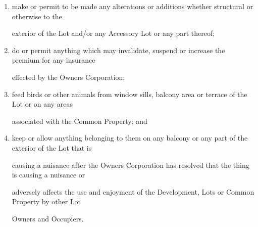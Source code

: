 \documentclass{article}
\begin{document}
\begin{enumerate}[label=\arabic*.]
\begin{enumerate}[label=\arabic{enumi}.\arabic*.]
\begin{enumerate}[label=(\arabic*)]
\begin{enumerate}[label=(\alph*)]
{\fontsize{10.02}{1}or a screen or barrier to prevent entry of animals or insects, unless: }

{\fontsize{9.962}{1}(i) the device, screen or barrier is soundly built and is consistent with the colour, style and }

{\fontsize{10.02}{1}materials of the Building; and }

{\fontsize{10.02}{1}(ii) any device, screen or barrier installed is maintained in good order and repair. }

{\fontsize{9.962}{1}(i) install additional locks or devices to the main apartment fire door that could cause the door to be }

{\fontsize{10.02}{1}made non-compliant to the fire regulations annual audit which in any case such installation will be }

{\fontsize{10.02}{1}subject to obtaining the prior written consent of the Owners Corporation; }

\item {\fontsize{9.962}{1} make or permit to be made any alterations or additions whether structural or otherwise to the }

{\fontsize{10.02}{1}exterior of the Lot and/or any Accessory Lot or any part thereof; }

\item {\fontsize{9.962}{1} do or permit anything which may invalidate, suspend or increase the premium for any insurance }

{\fontsize{10.02}{1}effected by the Owners Corporation; }

\newpage

\item {\fontsize{9.962}{1} feed birds or other animals from window sills, balcony area or terrace of the Lot or on any areas }

{\fontsize{10.02}{1}associated with the Common Property; and }

\item {\fontsize{9.962}{1} keep or allow anything belonging to them on any balcony or any part of the exterior of the Lot that is }

{\fontsize{10.02}{1}causing a nuisance after the Owners Corporation has resolved that the thing is causing a nuisance or }

{\fontsize{10.02}{1}adversely affects the use and enjoyment of the Development, Lots or Common Property by other Lot }

{\fontsize{10.02}{1}Owners and Occupiers. }


\end{enumerate}
\end{enumerate}
\end{enumerate}
\end{enumerate}
\end{document}
